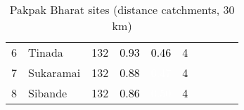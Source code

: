 \begin{table}[ht]
\begin{tabular}{C{0.03\textwidth}C{0.12\textwidth}C{0.09\textwidth}C{0.08\textwidth}C{0.08\textwidth}C{0.08\textwidth}C{0.07\textwidth}C{0.07\textwidth}C{0.07\textwidth}C{0.07\textwidth}}
  {6} & Tinada & 132 & \textcolor[HTML]{000000}{0.93} & \textcolor[HTML]{000000}{0.46} & \textcolor[HTML]{000000}{4} &  &  &  &  \\ 
  {7} & Sukaramai & 132 & \textcolor[HTML]{000000}{0.88} & \textcolor[HTML]{FFFFFF}{0.47} & \textcolor[HTML]{000000}{4} &  &  &  &  \\ 
  {8} & Sibande & 132 & \textcolor[HTML]{000000}{0.86} & \textcolor[HTML]{FFFFFF}{0.50} & \textcolor[HTML]{000000}{4} &  &  &  &  \\ 
  \end{tabular}
\endgroup
\caption{Pakpak Bharat sites (distance catchments, 30 km)} 
\label{tab:pakpak_bharat_dist}
\end{table}
